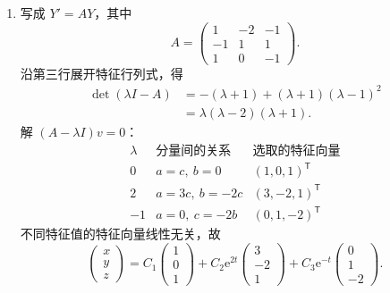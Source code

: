 \documentclass[UTF8,a4paper,11pt]{ctexart}
\newcommand{\e}{\mathrm e}
\begin{document}
\begin{solution}
\begin{enumerate}[label=(\arabic*)]
\item 写成 $Y'=AY$，其中
\[
A=\begin{pmatrix}1&-2&-1\\-1&1&1\\1&0&-1\end{pmatrix}.
\]
沿第三行展开特征行列式，得
\[
\begin{aligned}
\det(\lambda I-A)
&=-(\lambda+1)+(\lambda+1)(\lambda-1)^2\\
&=\lambda(\lambda-2)(\lambda+1).
\end{aligned}
\]
解 $(A-\lambda I)v=0$：
\[
\begin{array}{c|c|c}
\lambda&\text{分量间的关系}&\text{选取的特征向量}\\ \hline
0&a=c,\ b=0&(1,0,1)^{\mathsf T}\\
2&a=3c,\ b=-2c&(3,-2,1)^{\mathsf T}\\
-1&a=0,\ c=-2b&(0,1,-2)^{\mathsf T}
\end{array}
\]
不同特征值的特征向量线性无关，故
\[
\boxed{
\begin{pmatrix}x\\y\\z\end{pmatrix}
=C_1\begin{pmatrix}1\\0\\1\end{pmatrix}
+C_2\e^{2t}\begin{pmatrix}3\\-2\\1\end{pmatrix}
+C_3\e^{-t}\begin{pmatrix}0\\1\\-2\end{pmatrix}.}
\]


\end{enumerate}
\end{solution}
\end{document}
